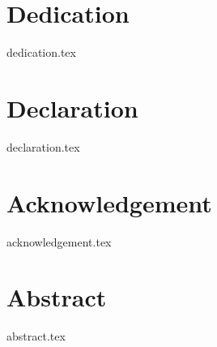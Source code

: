 \documentclass[12pt, openany]{book}
\begin{document}
\frontmatter

\maketitle

\chapter{Dedication}
{dedication.tex}

\chapter{Declaration}
{declaration.tex}

\chapter{Acknowledgement}
{acknowledgement.tex}

\chapter{Abstract}
{abstract.tex}
\end{document}
